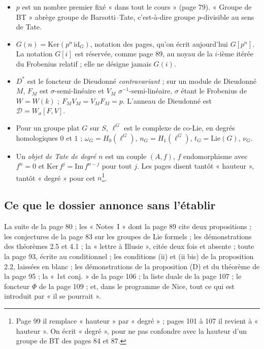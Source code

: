 \documentclass[11pt,a4paper]{article}
\begin{document}
\begin{itemize}
  \item $p$ est un nombre premier fixé « dans tout le cours » (page 79).
  « Groupe de BT » abrège groupe de Barsotti–Tate, c'est-à-dire groupe
  $p$-divisible au sens de Tate.
  \item $G(n) = \mathrm{Ker}(p^{n}\,\mathrm{id}_G)$, notation des pages,
  qu'on écrit aujourd'hui $G[p^{n}]$. La notation $G[i]$ est réservée,
  comme page 89, au noyau de la $i$-ième itérée du Frobenius relatif ; elle
  ne désigne jamais $G(i)$.
  \item $D^{*}$ est le foncteur de Dieudonné \emph{contravariant} ; sur un
  module de Dieudonné $M$, $F_M$ est $\sigma$-semi-linéaire et $V_M$
  $\sigma^{-1}$-semi-linéaire, $\sigma$ étant le Frobenius de $W = W(k)$ ;
  $F_M V_M = V_M F_M = p$. L'anneau de Dieudonné est
  $\mathcal{D} = W_{\sigma}[F, V]$.
  \item Pour un groupe plat $G$ sur $S$, $\ell^{G}$ est le complexe de
  co-Lie, en degrés homologiques $0$ et $1$ ; $\omega_G = H_0(\ell^{G})$,
  $n_G = H_1(\ell^{G})$, $t_G = \mathrm{Lie}(G)$, $\nu_G$.
  \item Un \emph{objet de Tate de degré $n$} est un couple $(A, f)$, $f$
  endomorphisme avec $f^{n} = 0$ et $\mathrm{Ker}\, f^{j} =
  \mathrm{Im}\, f^{n-j}$ pour tout $j$. Les pages disent tantôt
  « hauteur », tantôt « degré » pour cet $n$\footnote{Page 99 il remplace
  « hauteur » par « degré » ; pages 101 à 107 il revient à « hauteur ». On
  écrit « degré », pour ne pas confondre avec la hauteur d'un groupe de BT
  des pages 84 et 87.}.
\end{itemize}

\subsection*{Ce que le dossier annonce sans l'établir}

La suite de la page 80 ; les « Notes~I » dont la page 89 cite deux
propositions ; les conjectures de la page 83 sur les groupes de Lie
formels ; les démonstrations des théorèmes 2.5 et 4.1 ; la « lettre à
Illusie », citée deux fois et absente ; toute la page 93, écrite au
conditionnel ; les conditions (ii) et (ii bis) de la proposition 2.2,
laissées en blanc ; les démonstrations de la proposition (D) et du
théorème de la page 95 ; la « 1st conj. » de la page 106 ; la liste duale
de la page 107 ; le foncteur $\Phi$ de la page 109 ; et, dans le programme
de Nice, tout ce qui est introduit par « il se pourrait ».
\end{document}
